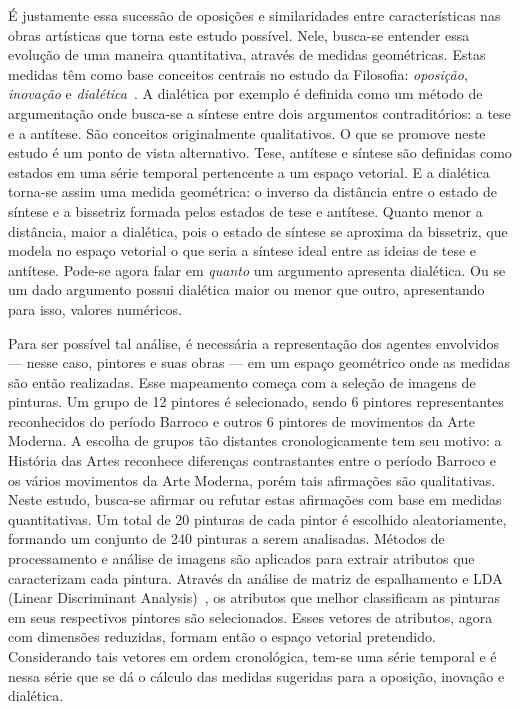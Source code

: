 É justamente essa sucessão de oposições e similaridades entre
características nas obras artísticas que torna este estudo
possível. Nele, busca-se entender essa evolução de uma maneira
quantitativa, através de medidas geométricas. Estas medidas têm como
base conceitos centrais no estudo da Filosofia: \textit{oposição},
\textit{inovação} e \textit{dialética}~\cite{deleuze,pinto,van}. A
dialética por exemplo é definida como um método de argumentação onde
busca-se a síntese entre dois argumentos contraditórios: a tese e a
antítese. São conceitos originalmente qualitativos. O que se promove
neste estudo é um ponto de vista alternativo. Tese, antítese e síntese
são definidas como estados em uma série temporal pertencente a um
espaço vetorial. E a dialética torna-se assim uma medida geométrica: o
inverso da distância entre o estado de síntese e a bissetriz formada
pelos estados de tese e antítese. Quanto menor a distância, maior a
dialética, pois o estado de síntese se aproxima da bissetriz, que
modela no espaço vetorial o que seria a síntese ideal entre as ideias
de tese e antítese. Pode-se agora falar em \emph{quanto} um argumento
apresenta dialética. Ou se um dado argumento possui dialética maior ou
menor que outro, apresentando para isso, valores numéricos.

Para ser possível tal análise, é necessária a representação dos
agentes envolvidos --- nesse caso, pintores e suas obras --- em um
espaço geométrico onde as medidas são então realizadas. Esse
mapeamento começa com a seleção de imagens de pinturas. Um grupo de 12
pintores é selecionado, sendo 6 pintores representantes reconhecidos
do período Barroco e outros 6 pintores de movimentos da Arte
Moderna. A escolha de grupos tão distantes cronologicamente tem seu
motivo: a História das Artes reconhece diferenças contrastantes entre
o período Barroco e os vários movimentos da Arte Moderna, porém tais
afirmações são qualitativas. Neste estudo, busca-se afirmar ou refutar
estas afirmações com base em medidas quantitativas. Um total de 20
pinturas de cada pintor é escolhido aleatoriamente, formando um
conjunto de 240 pinturas a serem analisadas. Métodos de processamento
e análise de imagens são aplicados para extrair atributos que
caracterizam cada pintura. Através da análise de matriz de
espalhamento e LDA (Linear Discriminant
Analysis)~\cite{luciano,fisher}, os atributos que melhor classificam
as pinturas em seus respectivos pintores são selecionados. Esses
vetores de atributos, agora com dimensões reduzidas, formam então o
espaço vetorial pretendido. Considerando tais vetores em ordem
cronológica, tem-se uma série temporal e é nessa série que se dá o
cálculo das medidas sugeridas para a oposição, inovação e dialética.

